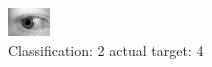 \begin{figure}[h!]
\begin{center}
\includegraphics[width=0.60\columnwidth]{figures/ID822_class_2_target_4.png}
\end{center}
\caption{ Classification: 2 actual target: 4}
\label{fig:ID822_class_2_target_4}
\end{figure}
